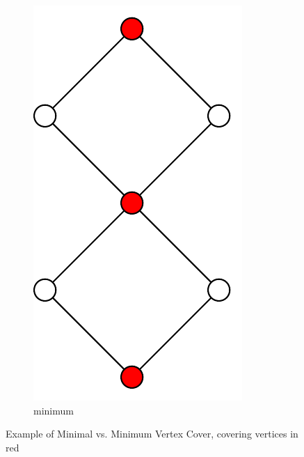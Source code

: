 \begin{figure}[ht]
  \hspace{2em}
  \begin{subfigure}{0.25\textwidth}
    \centering
    \includegraphics[width=\textwidth]{img/example_minimum_vertex_cover.pdf}
    \caption{minimum}
  \end{subfigure}
  \caption{\label{fig:example_vertex_cover}%
    Example of Minimal vs. Minimum Vertex Cover, covering vertices %
    in red
  }
\end{figure}

